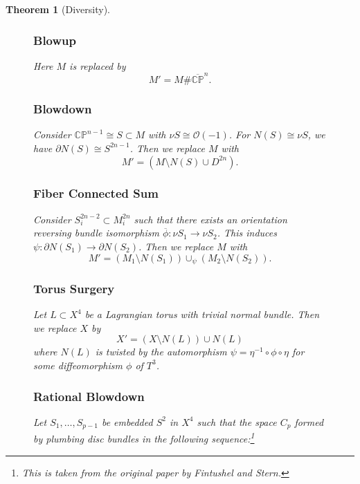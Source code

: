 \documentclass[leqno, openany]{memoir}
\newtheorem{thm}{Theorem}[chapter]
\theoremstyle{definition}
\theoremstyle{remark}
\theoremstyle{plain}
\theoremstyle{definition}
\theoremstyle{remark}
\newcommand{\C}{\mathbb{C}}
\renewcommand{\P}{\mathbb{P}}
\newcommand{\mc}[1]{\mathcal{#1}}
\begin{document}
\begin{thm}[Diversity]
\begin{figure}[H]
    \subsubsection{Blowup} Here $M$ is replaced by \[ M' = M \#
    \overline{\C\P}^n. \]

    \subsubsection{Blowdown}%
    
    Consider $\C\P^{n-1} \cong S \subset M$ with $\nu S \cong \mc{O}(-1)$. For
    $N(S) \cong \nu S$, we have $\partial N(S) \cong S^{2n-1}$. Then we replace
    $M$ with \[ M' = (M \setminus N(S) \cup D^{2n}). \]

    \subsubsection{Fiber Connected Sum} Consider $S_i^{2n-2} \subset M_i^{2n}$
    such that there exists an orientation \textit{reversing} bundle isomorphism
    $\overline{\phi}: \nu S_1 \to \nu S_2$. This induces $\psi: \partial N(S_1)
    \to \partial N(S_2)$. Then we replace $M$ with \[ M' = (M_1 \setminus
    N(S_1)) \cup_{\psi} (M_2 \setminus N(S_2)). \]
    
    \subsubsection{Torus Surgery} Let $L \subset X^4$ be a Lagrangian torus
    with trivial normal bundle. Then we replace $X$ by \[ X' = (X \setminus
    N(L)) \cup N(L) \] where $N(L)$ is twisted by the automorphism $\psi =
    \eta^{-1} \circ \phi \circ \eta$ for some diffeomorphism $\phi$ of $T^3$.
        
    \subsubsection{Rational Blowdown} Let $S_1, \ldots, S_{p-1}$ be embedded
    $S^2$ in $X^4$ such that the space $C_p$ formed by plumbing disc bundles in
    the following sequence:\footnote{This is taken from the original paper by
    Fintushel and Stern.}
    

\end{figure}
\end{thm}
\end{document}
